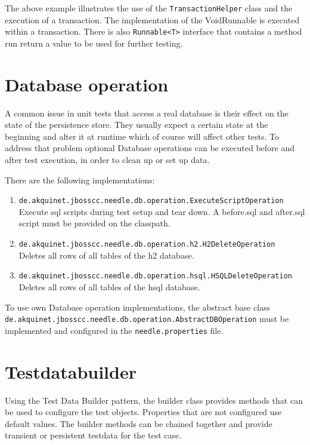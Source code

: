 The above example illustrates the use of the \verb|TransactionHelper| class and the execution of a transaction. The implementation of the VoidRunnable is executed within a transaction. There is also \verb|Runnable<T>| interface that contains a method run return a value to be used for further testing.

\section{Database operation}

A common issue in unit tests that access a real database is their effect on the state of the persistence store.
They usually expect a certain state at the beginning and alter it at runtime which of course will affect other tests.
To address that problem optional Database operations can be executed before and after test execution, in order to clean up or set up data. 

There are the following implementations:
\begin{enumerate}
\item \verb|de.akquinet.jbosscc.needle.db.operation.ExecuteScriptOperation| \\ Execute sql scripts during test setup and tear down. A before.sql and after.sql script must be provided on the classpath.
\item \verb|de.akquinet.jbosscc.needle.db.operation.h2.H2DeleteOperation| \\ Deletes all rows of all tables of the h2 database.
\item \verb|de.akquinet.jbosscc.needle.db.operation.hsql.HSQLDeleteOperation| \\ Deletes all rows of all tables of the hsql database.
\end{enumerate}

To use own Database operation implementations, the abstract base class \verb|de.akquinet.jbosscc.needle.db.operation.AbstractDBOperation| must be implemented and configured in the \verb|needle.properties| file.

\section{Testdatabuilder}

Using the Test Data Builder pattern, the builder class provides methods that can be used to configure the test objects. 
Properties that are not configured use default values. The builder methods can be chained together and provide transient or persistent testdata for the test case.

